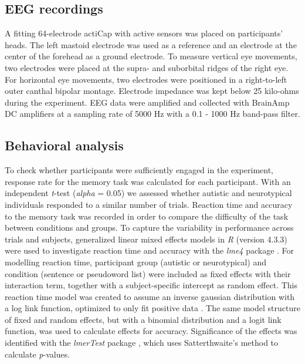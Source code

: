 \subsection{EEG recordings}
A fitting 64-electrode actiCap with active sensors was placed on participants' heads. The left mastoid electrode was used as a reference and an electrode at the center of the forehead as a ground electrode. To measure vertical eye movements, two electrodes were placed at the supra- and suborbital ridges of the right eye. For horizontal eye movements, two electrodes were positioned in a right-to-left outer canthal bipolar montage. Electrode impedance was kept below 25 kilo-ohms during the experiment. EEG data were amplified and collected with BrainAmp DC amplifiers at a sampling rate of 5000 Hz with a 0.1 - 1000 Hz band-pass filter. 

\subsection{Behavioral analysis}
To check whether participants were sufficiently engaged in the experiment, response rate for the memory task was calculated for each participant. With an independent \textit{t}-test (\textit{alpha} = 0.05) we assessed whether autistic and neurotypical individuals responded to a similar number of trials. Reaction time and accuracy to the memory task was recorded in order to compare the difficulty of the task between conditions and groups. To capture the variability in performance across trials and subjects, generalized linear mixed effects models in \textit{R} (version 4.3.3) were used to investigate reaction time and accuracy with the \textit{lme4} package \citep{bates2015}. For modelling reaction time, participant group (autistic or neurotypical) and condition (sentence or pseudoword list) were included as fixed effects with their interaction term, together with a subject-specific intercept as random effect. This reaction time model was created to assume an inverse gaussian distribution with a log link function, optimized to only fit positive data \citep{lo2015}. The same model structure of fixed and random effects, but with a binomial distribution and a logit link function, was used to calculate effects for accuracy. Significance of the effects was identified with the \textit{lmerTest} package \citep{kuznetsova2017}, which uses Satterthwaite's method to calculate \textit{p}-values. 

